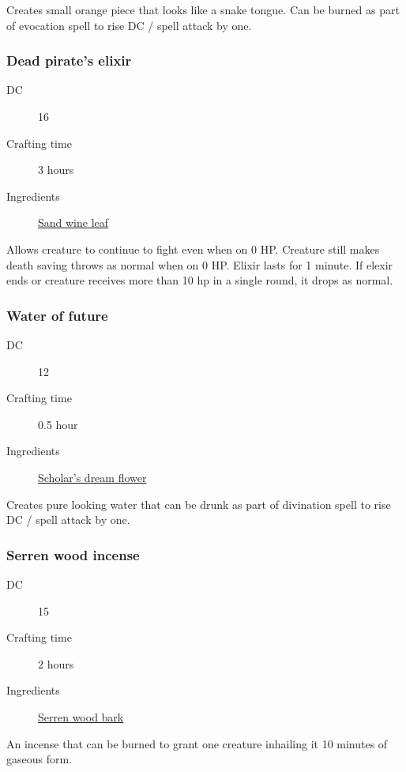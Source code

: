 Creates small orange piece that looks like a snake tongue. 
Can be burned as part of evocation spell to rise DC / spell attack by one.

\subsubsection{Dead pirate's elixir}
\label{Dead pirate's elixir}

\begin{description}
\item [DC] 16
\item [Crafting time] 3 hours
\item [Ingredients] \hyperref[Sand vine]{Sand wine leaf}
\end{description}

Allows creature to continue to fight even when on 0 HP. Creature still makes death saving throws as normal when on 0 HP. 
Elixir lasts for 1 minute. If elexir ends or creature receives more than 10 hp in a single round, it drops 
as normal.

\subsubsection{Water of future}
\label{Water of future}

\begin{description}
\item [DC] 12
\item [Crafting time] 0.5 hour
\item [Ingredients] \hyperref[Scholar's dream]{Scholar's dream flower}
\end{description}

Creates pure looking water that can be drunk as part of divination spell to rise DC / spell attack by one.

\subsubsection{Serren wood incense}
\label{Serren wood incense}

\begin{description}
\item [DC] 15
\item [Crafting time] 2 hours
\item [Ingredients] \hyperref[Serren Wood]{Serren wood bark}
\end{description}

An incense that can be burned to grant one creature inhailing it 10 minutes of gaseous form.

